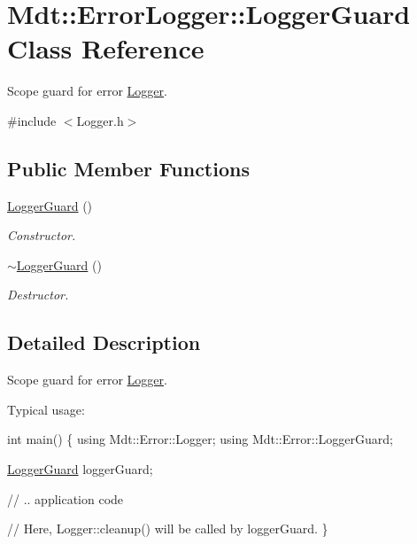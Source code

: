 \hypertarget{class_mdt_1_1_error_logger_1_1_logger_guard}{}\section{Mdt\+:\+:Error\+Logger\+:\+:Logger\+Guard Class Reference}
\label{class_mdt_1_1_error_logger_1_1_logger_guard}


Scope guard for error \hyperlink{class_mdt_1_1_error_logger_1_1_logger}{Logger}.  




{\ttfamily \#include $<$Logger.\+h$>$}

\subsection*{Public Member Functions}
\begin{DoxyCompactItemize}
\item 
\hyperlink{class_mdt_1_1_error_logger_1_1_logger_guard_a206dae2204438c86ce5fb70470b800e4}{Logger\+Guard} ()
\begin{DoxyCompactList}\small\item\em Constructor. \end{DoxyCompactList}\item 
\hyperlink{class_mdt_1_1_error_logger_1_1_logger_guard_a46942a98dcdf36a9df5857e9114e7466}{$\sim$\+Logger\+Guard} ()
\begin{DoxyCompactList}\small\item\em Destructor. \end{DoxyCompactList}\end{DoxyCompactItemize}


\subsection{Detailed Description}
Scope guard for error \hyperlink{class_mdt_1_1_error_logger_1_1_logger}{Logger}. 

Typical usage\+: 
\begin{DoxyCode}
\textcolor{keywordtype}{int} main()
\{
  \textcolor{keyword}{using} Mdt::Error::Logger;
  \textcolor{keyword}{using} Mdt::Error::LoggerGuard;

  \hyperlink{class_mdt_1_1_error_logger_1_1_logger_guard_a206dae2204438c86ce5fb70470b800e4}{LoggerGuard} loggerGuard;

  \textcolor{comment}{// .. application code}

  \textcolor{comment}{// Here, Logger::cleanup() will be called by loggerGuard.}
\}
\end{DoxyCode}



